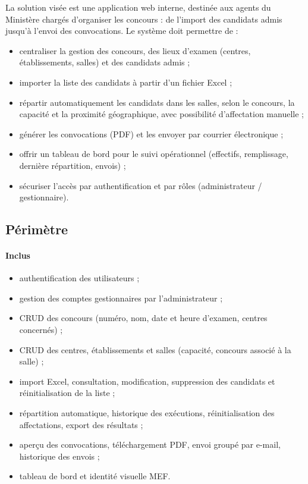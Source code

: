 \begin{onehalfspace}
La solution visée est une application web interne, destinée aux agents du Ministère chargés d'organiser les concours : de l'import des candidats admis jusqu'à l'envoi des convocations. Le système doit permettre de :

\begin{itemize}
  \item centraliser la gestion des concours, des lieux d'examen (centres, établissements, salles) et des candidats admis ;
  \item importer la liste des candidats à partir d'un fichier Excel ;
  \item répartir automatiquement les candidats dans les salles, selon le concours, la capacité et la proximité géographique, avec possibilité d'affectation manuelle ;
  \item générer les convocations (PDF) et les envoyer par courrier électronique ;
  \item offrir un tableau de bord pour le suivi opérationnel (effectifs, remplissage, dernière répartition, envois) ;
  \item sécuriser l'accès par authentification et par rôles (administrateur / gestionnaire).
\end{itemize}

\subsection{Périmètre}

\paragraph{Inclus}

\begin{itemize}
  \item authentification des utilisateurs ;
  \item gestion des comptes gestionnaires par l'administrateur ;
  \item CRUD des concours (numéro, nom, date et heure d'examen, centres concernés) ;
  \item CRUD des centres, établissements et salles (capacité, concours associé à la salle) ;
  \item import Excel, consultation, modification, suppression des candidats et réinitialisation de la liste ;
  \item répartition automatique, historique des exécutions, réinitialisation des affectations, export des résultats ;
  \item aperçu des convocations, téléchargement PDF, envoi groupé par e-mail, historique des envois ;
  \item tableau de bord et identité visuelle MEF.
\end{itemize}


\end{onehalfspace}
